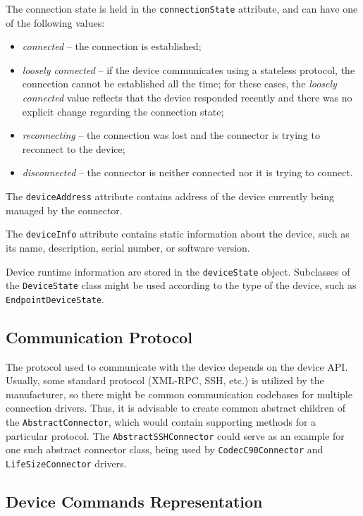 The connection state is held in the \texttt{connectionState} attribute, and can have one of the following values:
\begin{itemize}
\item \textit{connected} -- the connection is established;
\item \textit{loosely connected} -- if the device communicates using a stateless protocol, the connection cannot be established all the time; for these cases, the \textit{loosely connected} value reflects that the device responded recently and there was no explicit change regarding the connection state;
\item \textit{reconnecting} -- the connection was lost and the connector is trying to reconnect to the device;
\item \textit{disconnected} -- the connector is neither connected nor it is trying to connect.
\end{itemize}

The \texttt{deviceAddress} attribute contains address of the device currently being managed by the connector.

The \texttt{deviceInfo} attribute contains static information about the device, such as its name, description, serial number, or software version.

Device runtime information are stored in the \texttt{deviceState} object. Subclasses of the \texttt{DeviceState} class might be used according to the type of the device, such as \texttt{EndpointDeviceState}.


\subsection{Communication Protocol}

The protocol used to communicate with the device depends on the device API. Usually, some standard protocol (XML-RPC, SSH, etc.) is utilized by the manufacturer, so there might be common communication codebases for multiple connection drivers. Thus, it is advisable to create common abstract children of the \texttt{AbstractConnector}, which would contain supporting methods for a particular protocol. The \texttt{AbstractSSHConnector} could serve as an example for one such abstract connector class, being used by \texttt{CodecC90Connector} and \texttt{LifeSizeConnector} drivers.


\subsection{Device Commands Representation}

